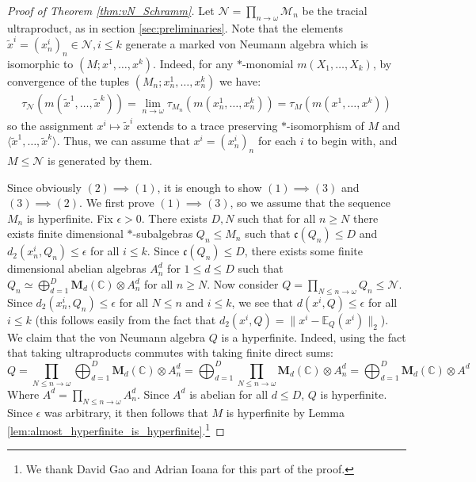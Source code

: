 \documentclass[11pt]{amsart}
\newcommand{\C}{{\mathbb{C}}}
\newcommand{\cN}{{\mathcal{N}}}
\newcommand{\fc}{\mathfrak{c}}
\newcommand{\bM}{{\mathbf{M}}}
\theoremstyle{definition}
\theoremstyle{remark}
\theoremstyle{definition}
\begin{document}
\begin{proof}[Proof of Theorem \ref{thm:vN_Schramm}]
    Let $\mathcal N = \prod_{n\to \omega} \mathcal M_n$ be the tracial ultraproduct, as in section \ref{sec:preliminaries}.
    Note that the elements $\widetilde{x}^i = (x_n^i)_n \in \mathcal N, i \leq k$ generate a marked von Neumann algebra which is isomorphic to $(M; x^1, \dots, x^k)$. Indeed, for any $*$-monomial $m(X_1, \dots, X_k)$, by convergence of the tuples $(M_n; x_n^1, \dots, x_n^k)$ we have:
    \begin{align*}
        \tau_\cN (m(\widetilde{x}^1, \dots, \widetilde{x}^k)) = \lim_{n \to \omega} \tau_{M_n} (m(x_n^1, \dots, x_n^k) ) = \tau_{M} (m(x^1, \dots, x^k))
    \end{align*}
    so the assignment $x^i \mapsto \widetilde{x}^i$ extends to a trace preserving $*$-isomorphism of $M$ and $\langle \widetilde{x}^1, \dots, \widetilde{x}^k \rangle$.
    Thus, we can assume that $x^i= (x_n^i)_n$ for each $i$ to begin with, and $M  \leq \mathcal N$ is generated by them.

    Since obviously $(2) \implies (1)$, it is enough to show $(1) \implies (3)$ and $(3) \implies (2)$.
        We first prove $(1) \implies (3)$, so we assume that the sequence $M_n$ is hyperfinite.
        Fix $\epsilon > 0$. There exists $D, N$ such that for all $n \geq N$ there exists finite dimensional $*$-subalgebras $Q_n \leq M_n$ such that $\fc(Q_n) \leq D$ and $d_2(x_n^i, Q_n) \leq \epsilon$ for all $i \leq k$.
        Since $\fc(Q_n) \leq D$, there exists some finite dimensional abelian algebras $A_n^d$ for $1\leq d \leq D$ such that $Q_n \simeq \bigoplus_{d=1}^D \bM_d(\C) \otimes A^d_n$ for all $n \geq N$. Now consider $Q = \prod_{N \leq n \to \omega} Q_n \leq \mathcal N$.
        Since $d_2(x_n^i, Q_n) \leq \epsilon$ for all $N \leq n$ and $i \leq k$, we see that $d(x^i, Q) \leq \epsilon$ for all $i \leq k$ (this follows easily from the fact that $d_2(x^i, Q) = \| x^i - \mathbb E_Q(x^i)\|_2$). 
        We claim that the von Neumann algebra $Q$ is a hyperfinite.
        Indeed, using the fact that taking ultraproducts commutes with taking finite direct sums:
        $$Q = \prod_{N \leq n \to \omega} \bigoplus_{d=1}^D \bM_d(\C) \otimes A_n^d  = \bigoplus_{d=1}^D \prod_{N \leq n \to \omega}  \bM_d(\C) \otimes A_n^d = \bigoplus_{d=1}^D  \bM_d(\C) \otimes A^d$$
        Where $A^d = \prod_{N \leq n \to \omega} A_n^d$. Since $A^d$  is abelian for all $d \leq D$,  $Q$ is hyperfinite. 
        Since $\epsilon$ was arbitrary, it then follows that $M$ is hyperfinite by Lemma \ref{lem:almost_hyperfinite_is_hyperfinite}.\footnote{We thank David Gao and Adrian Ioana for this part of the proof.}


\end{proof}
\end{document}
